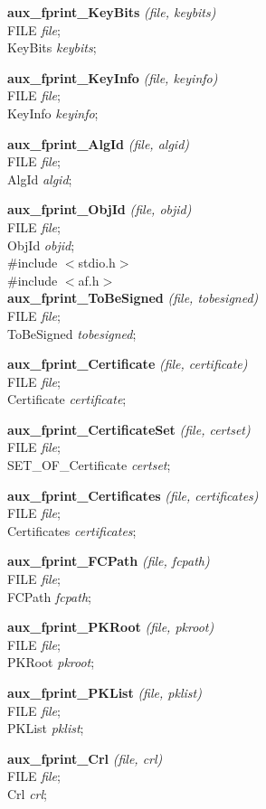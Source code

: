 {\bf aux\_fprint\_KeyBits} {\em (file, keybits)} \\
FILE {\em *file}; \\
KeyBits {\em *keybits};

{\bf aux\_fprint\_KeyInfo} {\em (file, keyinfo)} \\
FILE {\em *file}; \\
KeyInfo {\em *keyinfo};

{\bf aux\_fprint\_AlgId} {\em (file, algid)} \\
FILE {\em *file}; \\
AlgId {\em *algid};

{\bf aux\_fprint\_ObjId} {\em (file, objid)} \\
FILE {\em *file}; \\
ObjId {\em *objid};
\\ [1em]
\#include $<$stdio.h$>$ \\
\#include $<$af.h$>$ \\ [1em]
{\bf aux\_fprint\_ToBeSigned} {\em (file, tobesigned)} \\
FILE {\em *file}; \\
ToBeSigned {\em *tobesigned};

{\bf aux\_fprint\_Certificate} {\em (file, certificate)} \\
FILE {\em *file}; \\
Certificate {\em *certificate};

{\bf aux\_fprint\_CertificateSet} {\em (file, certset)} \\
FILE {\em *file}; \\
SET\_OF\_Certificate {\em *certset};

{\bf aux\_fprint\_Certificates} {\em (file, certificates)} \\
FILE {\em *file}; \\
Certificates {\em *certificates};

{\bf aux\_fprint\_FCPath} {\em (file, fcpath)} \\
FILE {\em *file}; \\
FCPath {\em *fcpath};

{\bf aux\_fprint\_PKRoot} {\em (file, pkroot)} \\
FILE {\em *file}; \\
PKRoot {\em *pkroot};

{\bf aux\_fprint\_PKList} {\em (file, pklist)} \\
FILE {\em *file}; \\
PKList {\em *pklist};

{\bf aux\_fprint\_Crl} {\em (file, crl)} \\
FILE {\em *file}; \\
Crl {\em *crl};

